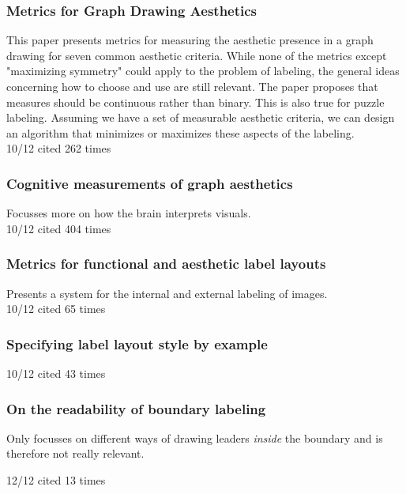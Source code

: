\documentclass[a4paper]{article}
\begin{document}
\subsubsection{Metrics for Graph Drawing Aesthetics \cite{purchase2002metrics}}
This paper presents metrics for measuring the aesthetic presence in a graph drawing for seven common aesthetic criteria. While none of the metrics except "maximizing symmetry" could apply to the problem of labeling, the general ideas concerning how to choose and use are still relevant. The paper proposes that measures should be continuous rather than binary. This is also true for puzzle labeling. Assuming we have a set of measurable aesthetic criteria, we can design an algorithm that minimizes or maximizes these aspects of the labeling.\\
10/12 cited 262 times

\subsubsection{Cognitive measurements of graph aesthetics \cite{ware2002cognitive}}
Focusses more on how the brain interprets visuals. \\
10/12 cited 404 times

\subsubsection{Metrics for functional and aesthetic label layouts \cite{hartmann2005metrics}}
Presents a system for the internal and external labeling of images. \\
10/12 cited 65 times


\subsubsection{Specifying label layout style by example \cite{vollick2007specifying}}
10/12 cited 43 times

\subsubsection{On the readability of boundary labeling \cite{barth2015readability}}
Only focusses on different ways of drawing leaders \textit{inside} the boundary and is therefore not really relevant.

12/12 cited 13 times

{}

\end{document}

